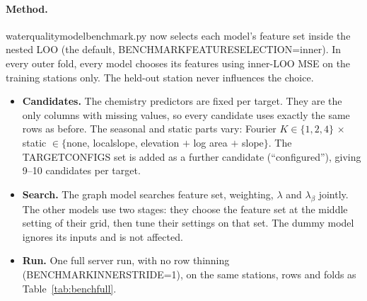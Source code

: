 \documentclass[11pt]{article}
\newcommand{\codeus}{\textunderscore\allowbreak}
\newcommand{\code}[1]{{\ttfamily\let\_\codeus #1}}
\begin{document}
\paragraph{Method.} \code{water\_quality\_model\_benchmark.py} now selects each model's feature set
inside the nested LOO (the default, \code{BENCHMARK\_FEATURE\_SELECTION=inner}). In every outer fold,
every model chooses its features using inner-LOO MSE on the training stations only. The held-out
station never influences the choice.
\begin{itemize}
  \item \textbf{Candidates.} The chemistry predictors are fixed per target. They are the only columns
        with missing values, so every candidate uses exactly the same rows as before. The seasonal
        and static parts vary: Fourier $K\in\{1,2,4\}$ $\times$ static
        $\in\{$none, \code{local\_slope}, elevation $+$ log area $+$ slope$\}$. The
        \code{TARGET\_CONFIGS} set is added as a further candidate (``configured''), giving 9--10
        candidates per target.
  \item \textbf{Search.} The graph model searches feature set, weighting, $\lambda$ and
        $\lambda_\beta$ jointly. The other models use two stages: they choose the feature set at the
        middle setting of their grid, then tune their settings on that set. The dummy model ignores
        its inputs and is not affected.
  \item \textbf{Run.} One full server run, with no row thinning (\code{BENCHMARK\_INNER\_STRIDE=1}),
        on the same stations, rows and folds as Table~\ref{tab:benchfull}.
\end{itemize}
\end{document}
